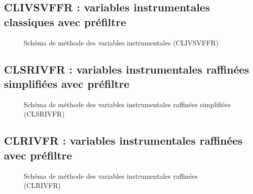 \documentclass{style/presentation}
\begin{document}
\subsection{CLIVSVFFR : variables instrumentales classiques avec préfiltre}
\begin{frame}
    \begin{figure}
        \centering
        \resizebox{!}{.9\textheight}{}
        \caption{Schéma de méthode des variables instrumentales (CLIVSVFFR)}
    \end{figure}
\end{frame}

\subsection{CLSRIVFR : variables instrumentales raffinées simplifiées avec préfiltre}
\begin{frame}
    \begin{figure}
        \centering
        \resizebox{!}{.9\textheight}{}
        \caption{Schéma de méthode des variables instrumentales raffinées simplifiées (CLSRIVFR)}
    \end{figure}
\end{frame}

\subsection{CLRIVFR : variables instrumentales raffinées avec préfiltre}
\begin{frame}
    \begin{figure}
        \centering
        \resizebox{!}{.9\textheight}{}
        \caption{Schéma de méthode des variables instrumentales raffinées (CLRIVFR)}
    \end{figure}
\end{frame}
\end{document}
